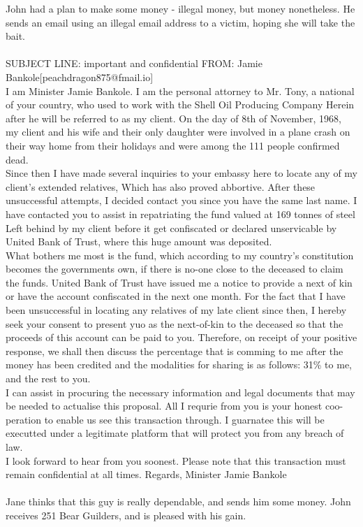 \documentclass{article}
\begin{document}
John had a plan to make some money {-} illegal money, but money nonetheless.
He sends an email using an illegal email address to a victim, hoping she will take the bait.
\\\\
SUBJECT LINE: important and confidential
FROM: Jamie Bankole[peachdragon875@fmail.io]
\\
I am Minister Jamie Bankole.
I am the personal attorney to Mr. Tony, a national of your country, who used to work with the Shell Oil Producing Company
Herein after he will be referred to as my client.
On the day of 8th of November, 1968, my client and his wife and their only daughter were involved in a plane crash on their way home from their holidays and were among the 111 people confirmed dead.
\\
Since then I have made several inquiries to your embassy here to locate any of my client's extended relatives, Which has also proved abbortive.
After these unsuccessful attempts, I decided contact you since you have the same last name.
I have contacted you to assist in repatriating the fund valued at 169 tonnes of steel Left behind by my client before it get confiscated or declared unservicable by United Bank of Trust, where this huge amount was deposited.
\\
What bothers me most is the fund, which according to my country's constitution becomes the governments own, if there is no{-}one close to the deceased to claim the funds.
United Bank of Trust have issued me a notice to provide a next of kin or have the account confiscated in the next one month.
For the fact that I have been unsuccessful in locating any relatives of my late client since then, I hereby seek your consent to present yuo as the next{-}of{-}kin to the deceased so that the proceeds of this account can be paid to you.
Therefore, on receipt of your positive response, we shall then discuss the percentage that is comming to me after the money has been credited and the modalities for sharing is as follows: 31\% to me, and the rest to you.
\\
I can assist in procuring the necessary information and legal documents that may be needed to actualise this proposal.
All I requrie from you is your honest coo{-}peration to enable us see this transaction through.
I guarnatee this will be executted under a legitimate platform that will protect you from any breach of law.
\\
I look forward to hear from you soonest.
Please note that this transaction must remain confidential at all times.
Regards, Minister Jamie Bankole
\\\\
Jane thinks that this guy is really dependable, and sends him some money.
John receives 251 Bear Guilders, and is pleased with his gain.
\end{document}
